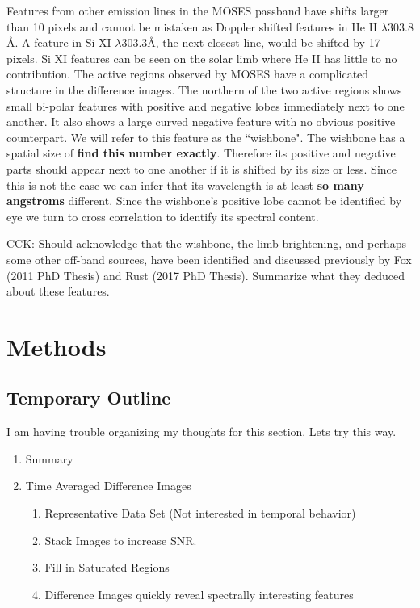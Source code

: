 \documentclass[]{solarphysics}
\newcommand{\cck}[1]{{\color{red} CCK: #1}} %
\begin{document}
\begin{article}
	Features from other emission lines in the MOSES passband have shifts larger than 10 pixels and cannot be mistaken as Doppler shifted features in He II $\lambda303.8$ \AA. A feature in Si XI $\lambda$303.3\AA , the next closest line, would be shifted by 17 pixels. Si XI features can be seen on the solar limb where He II has little to no contribution. The active regions observed by MOSES have a complicated structure in the difference images.  The northern of the two active regions shows small bi-polar features with positive and negative lobes immediately next to one another.  It also shows a large curved negative feature with no obvious positive counterpart.  We will refer to this feature as the ``wishbone".  The wishbone has a spatial size of \textbf{find this number exactly}.  Therefore its positive and negative parts should appear next to one another if it is shifted by its size or less.  Since this is not the case we can infer that its wavelength is at least \textbf{so many angstroms} different.  Since the wishbone's positive lobe cannot be identified by eye we turn to cross correlation to identify its spectral content.
	
\cck{Should acknowledge that the wishbone, the limb brightening, and perhaps some other off-band sources, have been identified and discussed previously by Fox (2011 PhD Thesis) and Rust (2017 PhD Thesis). Summarize what they deduced about these features.}
	
	
	

\section{Methods}
	\subsection{Temporary Outline}
		I am having trouble organizing my thoughts for this section.  Lets try this way.
		\begin{enumerate}
			\item Summary
			\item Time Averaged Difference Images
				\begin{enumerate}
					\item Representative Data Set (Not interested in temporal behavior)
					\item Stack Images to increase SNR.
					\item Fill in Saturated Regions
					\item Difference Images quickly reveal spectrally interesting features
				\end{enumerate}
			

\end{enumerate}
\end{article}
\end{document}
